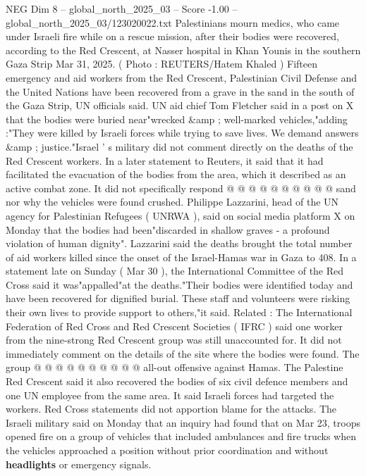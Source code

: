 \begin{textsample}{NEG Dim 8 – global\_north\_2025\_03 – Score -1.00 – global\_north\_2025\_03/123020022.txt}  \label{ex:f8_neg_127}
Palestinians mourn medics, who came under Israeli fire while on a rescue mission, after their bodies were recovered, according to the Red Crescent, at Nasser hospital in Khan Younis in the southern Gaza Strip Mar 31, 2025. ( Photo : REUTERS/Hatem Khaled ) Fifteen emergency and aid workers from the Red Crescent, Palestinian Civil Defense and the United Nations have been recovered from a grave in the sand in the south of the Gaza Strip, UN officials said.
UN aid chief Tom Fletcher said in a post on X that the bodies were buried near"wrecked \&amp ; well-marked vehicles,"adding :"They were killed by Israeli forces while trying to save lives.
We demand answers \&amp ; justice."Israel ' s military did not comment directly on the deaths of the Red Crescent workers.
In a later statement to Reuters, it said that it had facilitated the evacuation of the bodies from the area, which it described as an active combat zone.
It did not specifically respond @ @ @ @ @ @ @ @ @ @ sand nor why the vehicles were found crushed.
Philippe Lazzarini, head of the UN agency for Palestinian Refugees ( UNRWA ), said on social media platform X on Monday that the bodies had been"discarded in shallow graves - a profound violation of human dignity".
Lazzarini said the deaths brought the total number of aid workers killed since the onset of the Israel-Hamas war in Gaza to 408.
In a statement late on Sunday ( Mar 30 ), the International Committee of the Red Cross said it was"appalled"at the deaths."Their bodies were identified today and have been recovered for dignified burial.
These staff and volunteers were risking their own lives to provide support to others,"it said.
Related : The International Federation of Red Cross and Red Crescent Societies ( IFRC ) said one worker from the nine-strong Red Crescent group was still unaccounted for.
It did not immediately comment on the details of the site where the bodies were found.
The group @ @ @ @ @ @ @ @ @ @ all-out offensive against Hamas.
The Palestine Red Crescent said it also recovered the bodies of six civil defence members and one UN employee from the same area.
It said Israeli forces had targeted the workers.
Red Cross statements did not apportion blame for the attacks.
The Israeli military said on Monday that an inquiry had found that on Mar 23, troops opened fire on a group of vehicles that included ambulances and fire trucks when the vehicles approached a position without prior coordination and without \textbf{headlights} or emergency signals.

\end{textsample}
